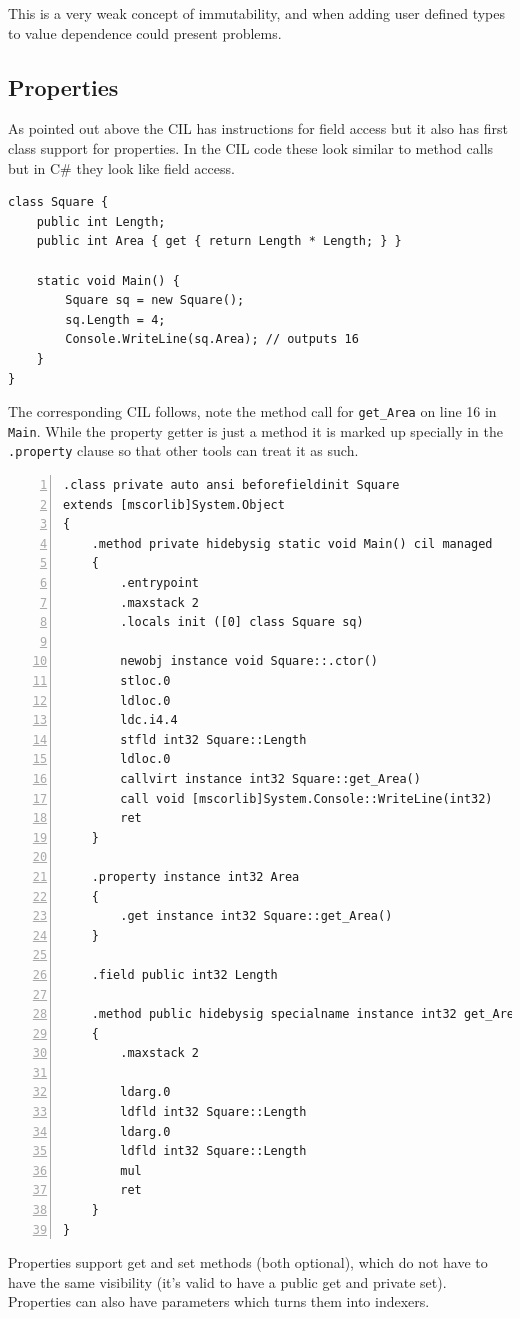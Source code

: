 \documentclass[english]{report}
\begin{document}
This is a very weak concept of immutability, and when adding user
defined types to value dependence could present problems.


\subsection{Properties}

As pointed out above the CIL has instructions for field access but
it also has first class support for properties. In the CIL code these
look similar to method calls but in C\# they look like field access.

\begin{lstlisting}[keywordstyle={\color{blue}},language=sharpc]
class Square {
	public int Length;
	public int Area { get { return Length * Length; } }

	static void Main() {
		Square sq = new Square();
		sq.Length = 4;
		Console.WriteLine(sq.Area); // outputs 16
	}
}
\end{lstlisting}


The corresponding CIL follows, note the method call for \texttt{get\_Area}
on line 16 in \texttt{Main}. While the property getter is just a method
it is marked up specially in the \texttt{.property} clause so that
other tools can treat it as such. 

\begin{lstlisting}[numbers=left]
.class private auto ansi beforefieldinit Square     
extends [mscorlib]System.Object 
{ 
	.method private hidebysig static void Main() cil managed     
	{         
		.entrypoint
		.maxstack 2
		.locals init ([0] class Square sq)
   
		newobj instance void Square::.ctor()         
		stloc.0          
		ldloc.0          
		ldc.i4.4          
		stfld int32 Square::Length         
		ldloc.0          
		callvirt instance int32 Square::get_Area()         
		call void [mscorlib]System.Console::WriteLine(int32)         
		ret
	}
	
	.property instance int32 Area     
	{
		.get instance int32 Square::get_Area()
	}
	
	.field public int32 Length 

	.method public hidebysig specialname instance int32 get_Area() cil managed
	{
		.maxstack 2

		ldarg.0
		ldfld int32 Square::Length
		ldarg.0 
		ldfld int32 Square::Length
		mul
		ret  
	}
}
\end{lstlisting}


Properties support get and set methods (both optional), which do not
have to have the same visibility (it's valid to have a public get
and private set). Properties can also have parameters which turns
them into indexers.
\end{document}

